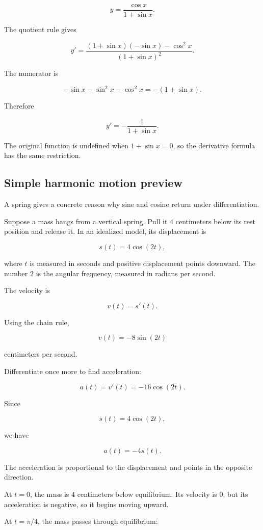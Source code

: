 \[
y=\frac{\cos x}{1+\sin x}.
\]

The quotient rule gives

\[
y'
=
\frac{(1+\sin x)(-\sin x)-\cos^2x}{(1+\sin x)^2}.
\]

The numerator is

\[
-\sin x-\sin^2x-\cos^2x
=
-(1+\sin x).
\]

Therefore

\[
\boxed{
y'=-\frac1{1+\sin x}.
}
\]

The original function is undefined when \(1+\sin x=0\), so the derivative formula
has the same restriction.

\subsection{Simple harmonic motion preview}
\label{subsec:shm-preview}

A spring gives a concrete reason why sine and cosine return under differentiation.

Suppose a mass hangs from a vertical spring. Pull it \(4\) centimeters below its rest
position and release it. In an idealized model, its displacement is

\[
s(t)=4\cos(2t),
\]

where \(t\) is measured in seconds and positive displacement points downward. The
number \(2\) is the angular frequency, measured in radians per second.

The velocity is

\[
v(t)=s'(t).
\]

Using the chain rule,

\[
\boxed{
v(t)=-8\sin(2t)
}
\]

centimeters per second.

Differentiate once more to find acceleration:

\[
a(t)=v'(t)=-16\cos(2t).
\]

Since

\[
s(t)=4\cos(2t),
\]

we have

\[
\boxed{
a(t)=-4s(t).
}
\]

The acceleration is proportional to the displacement and points in the opposite
direction.

At \(t=0\), the mass is \(4\) centimeters below equilibrium. Its velocity is \(0\),
but its acceleration is negative, so it begins moving upward.

At \(t=\pi/4\), the mass passes through equilibrium:

